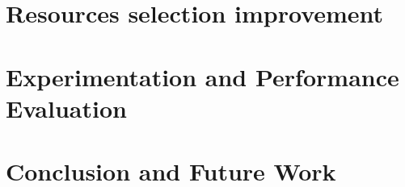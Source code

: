 \documentclass[conference]{IEEEtran}
\begin{document}
\section{Resources selection improvement}

\section{Experimentation and Performance Evaluation}

\label{sec:future}



\section{Conclusion and Future Work}














\end{document}
